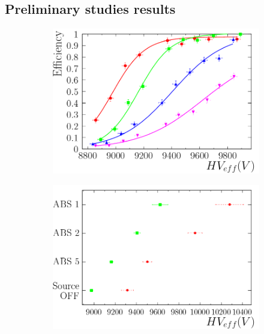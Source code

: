 	\subsection{Preliminary studies results}
	\label{ssec:GIFResults}
	
		\begin{figure}[!h]
			\begin{subfigure}{0.5\linewidth}
				\begin{center}
					\includegraphics[width = 0.6\plotwidth]{fig/Efficiencies.pdf}
					\caption{\label{fig:GIFResults:E}}
				\end{center}
			\end{subfigure}
			\begin{subfigure}{0.5\linewidth}
				\begin{center}
					\includegraphics[width = 0.6\plotwidth]{fig/Evol_HV.pdf}\\

\end{center}
\end{subfigure}
\end{figure}
